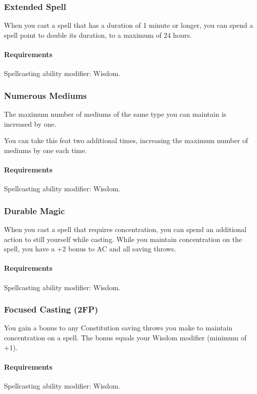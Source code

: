 \subsubsection{Extended Spell} \label{feat::extendedspell}
    When you cast a spell that has a duration of 1 minute or longer, you can spend a spell point to double its duration, to a maximum of 24 hours.
    \paragraph{Requirements} Spellcasting ability modifier: Wisdom.
\subsubsection{Numerous Mediums} \label{feat::numerousmediums}
    The maximum number of mediums of the same type you can maintain is increased by one.

    You can take this feat two additional times, increasing the maximum number of mediums by one each time.
    \paragraph{Requirements} Spellcasting ability modifier: Wisdom.
\subsubsection{Durable Magic} \label{feat::durablemagic}
    When you cast a spell that requires concentration, you can spend an additional action to still yourself while casting.
    While you maintain concentration on the spell, you have a +2 bonus to AC and all saving throws.
    \paragraph{Requirements} Spellcasting ability modifier: Wisdom.
\subsubsection{Focused Casting (2FP)} \label{feat::focusedcasting}
    You gain a bonus to any Constitution saving throws you make to maintain concentration on a spell.
    The bonus equals your Wisdom modifier (minimum of +1).
    \paragraph{Requirements} Spellcasting ability modifier: Wisdom.
